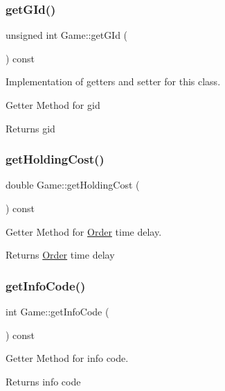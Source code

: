 \subsubsection{\texorpdfstring{get\+G\+Id()}{getGId()}}
{\footnotesize\ttfamily unsigned int Game\+::get\+G\+Id (\begin{DoxyParamCaption}{ }\end{DoxyParamCaption}) const}



Implementation of getters and setter for this class. 

Getter Method for gid \begin{DoxyReturn}{Returns}
gid 
\end{DoxyReturn}
\mbox{\label{classGame_a0842aaa236062f2a9dd7e9d32f0be131}} 
\subsubsection{\texorpdfstring{get\+Holding\+Cost()}{getHoldingCost()}}
{\footnotesize\ttfamily double Game\+::get\+Holding\+Cost (\begin{DoxyParamCaption}{ }\end{DoxyParamCaption}) const}



Getter Method for \hyperlink{classOrder}{Order} time delay. 

\begin{DoxyReturn}{Returns}
\hyperlink{classOrder}{Order} time delay 
\end{DoxyReturn}
\mbox{\label{classGame_aafa386030ee084fe10699ec84316e689}} 
\subsubsection{\texorpdfstring{get\+Info\+Code()}{getInfoCode()}}
{\footnotesize\ttfamily int Game\+::get\+Info\+Code (\begin{DoxyParamCaption}{ }\end{DoxyParamCaption}) const}



Getter Method for info code. 

\begin{DoxyReturn}{Returns}
info code 
\end{DoxyReturn}
\mbox{\label{classGame_acbda63cea0b23cda6e11c4384bf4a869}} 
